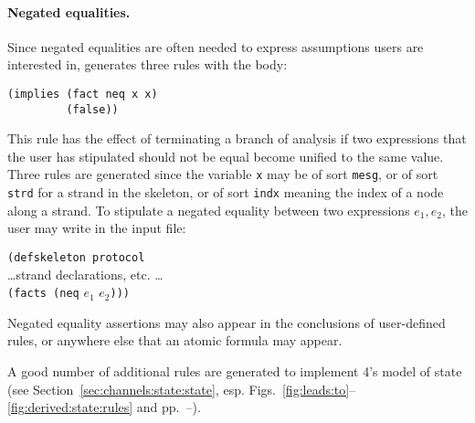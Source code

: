 \paragraph{Negated equalities.}  Since negated equalities are often
needed to express assumptions users are interested in, {\cpsa}
generates three rules with the body:
%
\begin{verbatim}(implies (fact neq x x)
         (false))
\end{verbatim}
%
This rule has the effect of terminating a branch of analysis if two
expressions that the user has stipulated should not be equal become
unified to the same value.  Three rules are generated since the
variable \verb|x| may be of sort \verb|mesg|, or of sort \verb|strd|
for a strand in the skeleton, or of sort \verb|indx| meaning the index
of a node along a strand.  To stipulate a negated equality between two
expressions $e_1,e_2$, the user may write in the input file:
%
\begin{tabbing}
\texttt{(de}\=\texttt{fskeleton protocol}  \\
  \>\dots strand declarations, etc. \dots \\
  \>\texttt{(facts (neq} $e_1$ $e_2$\texttt{)))}
\end{tabbing}
%
Negated equality assertions may also appear in the conclusions of
user-defined rules, or anywhere else that an atomic formula may
appear.

A good number of additional rules are generated to implement {\cpsa}
4's model of state (see Section~\ref{sec:channels:state:state},
esp. Figs.~\ref{fig:leads:to}--\ref{fig:derived:state:rules} and
pp.~\pageref{state:gen:rules:start}--\pageref{state:gen:rules:end}).

